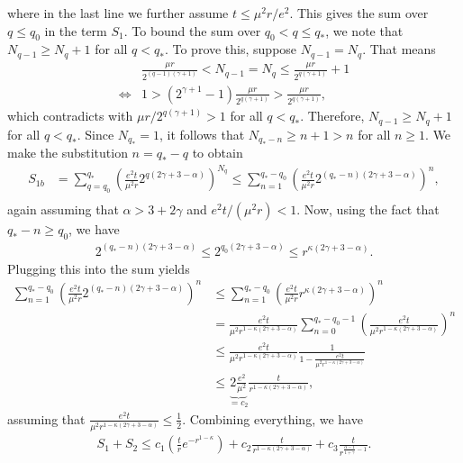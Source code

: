 where in the last line we further assume $t\le \mu^2r/e^2$.
This gives the sum over $q \le q_0$ in the term $S_1$.
To bound the sum over $q_0 < q \le q_*$, we note that $N_{q-1}\geq N_{q} +1$ for all $q<q_*$.
To prove this, suppose $N_{q-1} = N_q$.
That means
\begin{align}
	&\frac{\mu r}{2^{(q-1)(\gamma+1)}}<N_{q-1} = N_{q} \leq \frac{\mu r}{2^{q(\gamma+1)}} +1\\
	\Leftrightarrow & 1 > (2^{\gamma+1}-1) \frac{\mu r}{2^{q(\gamma+1)}} > \frac{\mu r}{2^{q(\gamma+1)}},
\end{align}
which contradicts with $\mu r/2^{q(\gamma+1)}> 1$ for all $q< q_*$.
Therefore, $N_{q-1}\geq N_q + 1$ for all $q<q_*$.
Since $N_{q_*} = 1$, it follows that $N_{q_*-n}\geq n+1>n$ for all $n\geq 1$.
We make the substitution $n= q_* - q$ to obtain
\begin{align}
S_{1b} &= \sum_{q=q_0}^{q_*}\left(\frac{e^2t}{\mu^2 r}2^{q(2\gamma+3-\alpha)}\right)^{N_q} \leq \sum_{n=1}^{q_*-q_0}\left(\frac{e^2t}{\mu^2 r}2^{(q_*-n)(2\gamma+3-\alpha)}\right)^{n},\\
\end{align}
again assuming that $\alpha>3+2\gamma$ and $e^2 t/(\mu^2 r)<1$.
Now, using the fact that $q_*-n \ge q_0$, we have
\begin{align}
	2^{(q_*-n)(2\gamma+3-\alpha)}\le 2^{q_0(2\gamma+3-\alpha)} \leq r^{\kappa(2\gamma+3-\alpha)}.
\end{align}
Plugging this into the sum yields
\begin{align}
\sum_{n=1}^{q_*-q_0}\left(\frac{e^2t}{\mu^2 r}2^{(q_*-n)(2\gamma+3-\alpha)}\right)^{n}
&\leq\sum_{n=1}^{q_*-q_0}\left(\frac{e^2t}{\mu^2 r}r^{\kappa(2\gamma+3-\alpha)}\right)^{n}\\
&= \frac{e^2 t}{\mu^2 r^{1-\kappa(2\gamma+3-\alpha)}}\sum_{n=0}^{q_*-q_0-1}\left(\frac{e^2t}{\mu^2 r^{1-\kappa(2\gamma+3-\alpha)}}\right)^{n} \\
&\leq \frac{e^2 t}{\mu^2 r^{1-\kappa(2\gamma+3-\alpha)}} \frac{1}{1 - \frac{e^2 t}{\mu^2 r^{1-\kappa(2\gamma+3-\alpha)}}}\\
&\leq \underbrace{2\frac{e^2}{\mu^2}}_{=c_2} \frac{t}{r^{1-\kappa(2\gamma+3-\alpha)}},
\end{align}
assuming that $\frac{e^2 t}{\mu^2 r^{1-\kappa(2\gamma+3-\alpha)}}\leq \frac 12$.
Combining everything, we have
\begin{align}
S_1 + S_2 \leq c_1 \left(\frac t r e^{-r^{1-\kappa}}\right) + c_2 \frac t{r^{1-\kappa(2\gamma+3-\alpha)}}+ c_3 \frac{t}{r^{\frac{\alpha-1}{1+\gamma}-1}}.\label{eq:two-terrm-after-sum}
\end{align}
